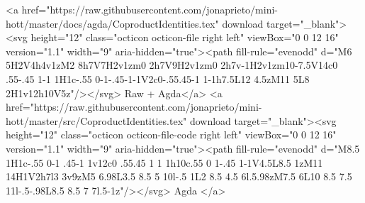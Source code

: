         <a href="https://raw.githubusercontent.com/jonaprieto/mini-hott/master/docs/agda/CoproductIdentities.tex" download target="_blank"><svg height="12" class="octicon octicon-file right left" viewBox="0 0 12 16" version="1.1" width="9" aria-hidden="true"><path fill-rule="evenodd" d="M6 5H2V4h4v1zM2 8h7V7H2v1zm0 2h7V9H2v1zm0 2h7v-1H2v1zm10-7.5V14c0 .55-.45 1-1 1H1c-.55 0-1-.45-1-1V2c0-.55.45-1 1-1h7.5L12 4.5zM11 5L8 2H1v12h10V5z"/></svg> Raw + Agda</a>
        <a href="https://raw.githubusercontent.com/jonaprieto/mini-hott/master/src/CoproductIdentities.tex" download target="_blank"><svg height="12" class="octicon octicon-file-code right left" viewBox="0 0 12 16" version="1.1" width="9" aria-hidden="true"><path fill-rule="evenodd" d="M8.5 1H1c-.55 0-1 .45-1 1v12c0 .55.45 1 1 1h10c.55 0 1-.45 1-1V4.5L8.5 1zM11 14H1V2h7l3 3v9zM5 6.98L3.5 8.5 5 10l-.5 1L2 8.5 4.5 6l.5.98zM7.5 6L10 8.5 7.5 11l-.5-.98L8.5 8.5 7 7l.5-1z"/></svg> Agda </a>
      
